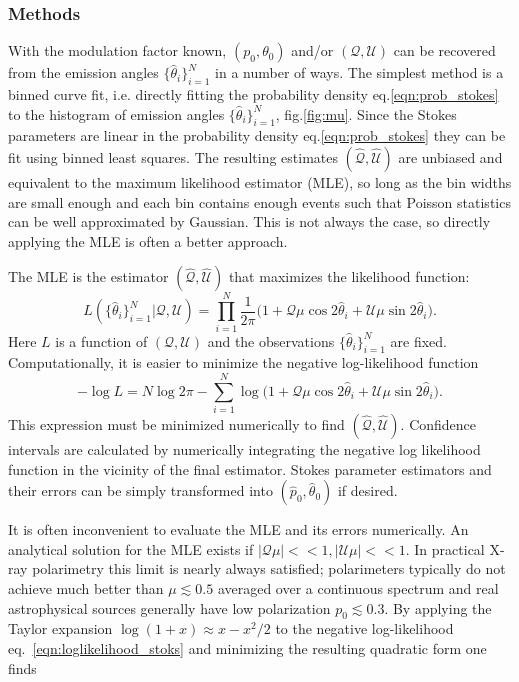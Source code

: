 \subsubsection{Methods}
With the modulation factor known, $(p_0, \theta_0)$ and/or $(\mathcal{Q}, \mathcal{U})$ can be recovered from the emission angles $\{\hat{\theta}_i\}_{i=1}^N$ in a number of ways. The simplest method is a binned curve fit, i.e. directly fitting the probability density eq.\ref{eqn:prob_stokes} to the histogram of emission angles $\{\hat{\theta}_i\}_{i=1}^N$, fig.\ref{fig:mu}. Since the Stokes parameters are linear in the probability density eq.\ref{eqn:prob_stokes} they can be fit using binned least squares. The resulting estimates $(\hat{\mathcal{Q}},\hat{\mathcal{U}})$ are unbiased and equivalent to the maximum likelihood estimator (MLE), so long as the bin widths are small enough and each bin contains enough events such that Poisson statistics can be well approximated by Gaussian. This is not always the case, so directly applying the MLE is often a better approach. 

The MLE is the estimator $(\hat{\mathcal{Q}},\hat{\mathcal{U}})$ that maximizes the likelihood function:
\begin{equation}
    L(\{\hat{\theta}_i\}_{i=1}^N|\mathcal{Q},\mathcal{U}) =  \prod_{i=1}^N\frac{1}{2\pi} \big(1 + \mathcal{Q}\mu\cos2\hat{\theta}_i + \mathcal{U}\mu\sin2\hat{\theta}_i \big).
    \label{eqn:likelihood_stoks}
\end{equation}
Here $L$ is a function of $(\mathcal{Q},\mathcal{U})$ and the observations $\{\hat{\theta}_i\}_{i=1}^N$ are fixed. Computationally, it is easier to minimize the negative log-likelihood function
\begin{equation}
    -\log L =  N\log 2\pi - \sum_{i=1}^N \log \big(1 + \mathcal{Q}\mu\cos2\hat{\theta}_i + \mathcal{U}\mu\sin2\hat{\theta}_i \big).
    \label{eqn:loglikelihood_stoks}
\end{equation}
This expression must be minimized numerically to find $(\hat{\mathcal{Q}},\hat{\mathcal{U}})$. Confidence intervals are calculated by numerically integrating the negative log likelihood function in the vicinity of the final estimator. Stokes parameter estimators and their errors can be simply transformed into $(\hat{p}_0,\hat{\theta}_0)$ if desired.

It is often inconvenient to evaluate the MLE and its errors numerically. An analytical solution for the MLE exists if $|\mathcal{Q}\mu| << 1, |\mathcal{U}\mu| << 1$. In practical X-ray polarimetry this limit is nearly always satisfied; polarimeters typically do not achieve much better than $\mu \lesssim 0.5$ averaged over a continuous spectrum and real astrophysical sources generally have low polarization $p_0 \lesssim 0.3$. By applying the Taylor expansion $\log(1+x) \approx x - x^2/2$  to the negative log-likelihood eq.~\ref{eqn:loglikelihood_stoks} and minimizing the resulting quadratic form one finds

